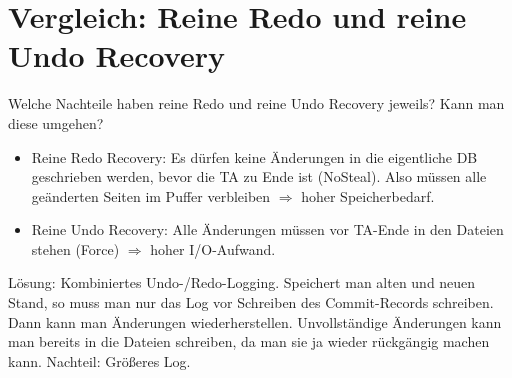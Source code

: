 \section{Vergleich: Reine Redo und reine Undo Recovery}

Welche Nachteile haben reine Redo und reine Undo Recovery jeweils? Kann man diese umgehen?

\begin{solution}
\begin{itemize}
	\item Reine Redo Recovery:
	Es dürfen keine Änderungen in die eigentliche DB geschrieben werden, bevor die TA zu Ende ist (NoSteal). Also müssen alle geänderten Seiten im Puffer verbleiben $\Rightarrow$ hoher Speicherbedarf.
	\item Reine Undo Recovery:
	Alle Änderungen müssen vor TA-Ende in den Dateien stehen (Force) $\Rightarrow$ hoher I/O-Aufwand.
\end{itemize}
Lösung: Kombiniertes Undo-/Redo-Logging. Speichert man alten und neuen Stand, so muss man nur das Log vor Schreiben des Commit-Records schreiben. Dann kann man Änderungen wiederherstellen. Unvollständige Änderungen kann man bereits in die Dateien schreiben, da man sie ja wieder rückgängig machen kann. Nachteil: Größeres Log.
\end{solution}
